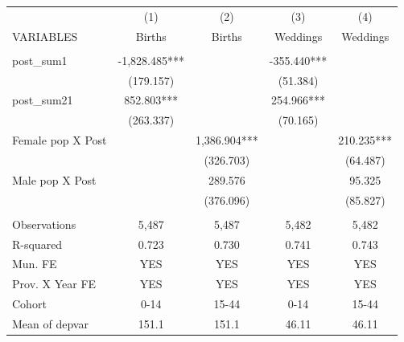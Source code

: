 \begin{tabular}{lcccc} \hline
 & (1) & (2) & (3) & (4) \\
VARIABLES & Births & Births & Weddings & Weddings \\ \hline
 &  &  &  &  \\
post\_sum1 & -1,828.485*** &  & -355.440*** &  \\
 & (179.157) &  & (51.384) &  \\
post\_sum21 & 852.803*** &  & 254.966*** &  \\
 & (263.337) &  & (70.165) &  \\
Female pop X Post &  & 1,386.904*** &  & 210.235*** \\
 &  & (326.703) &  & (64.487) \\
Male pop X Post &  & 289.576 &  & 95.325 \\
 &  & (376.096) &  & (85.827) \\
 &  &  &  &  \\
Observations & 5,487 & 5,487 & 5,482 & 5,482 \\
R-squared & 0.723 & 0.730 & 0.741 & 0.743 \\
Mun. FE & YES & YES & YES & YES \\
Prov. X Year FE & YES & YES & YES & YES \\
Cohort & 0-14 & 15-44 & 0-14 & 15-44 \\
 Mean of depvar & 151.1 & 151.1 & 46.11 & 46.11 \\ \hline
\end{tabular}
